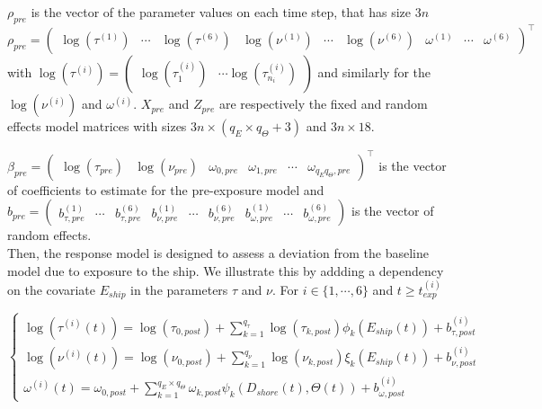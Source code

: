\documentclass[11pt]{article}
\newcommand {\1}{\mathbb{1}}
\begin{document}
$\rho_{pre}$ is the vector of the parameter values on each time step, that has size $3n$ \[\rho_{pre}=\begin{pmatrix}
\log(\tau^{(1)}) & \cdots & \log(\tau^{(6)}) & \log(\nu^{(1)}) &
\cdots & \log(\nu^{(6)}) & \omega^{(1)}  &\cdots & \omega^{(6)}
\end{pmatrix}^\top\]
with $	\log(\tau^{(i)})=\begin{pmatrix} \log(\tau^{(i)}_1) & \cdots \log(\tau^{(i)}_{n_i})\end{pmatrix}$ and similarly for the $\log(\nu^{(i)})$ and $\omega^{(i)}$.
$X_{pre}$ and $Z_{pre}$ are respectively the fixed and random effects model matrices with sizes $3n \times (q_E\times q_{\Theta}+3)$ and $3n \times 18$.

$\beta_{pre}=\begin{pmatrix}
	\log(\tau_{pre}) &
	\log(\nu_{pre})  &
	\omega_{0,pre} &
	\omega_{1,pre} &
	\cdots & 
	\omega_{q_E q_{\Theta},pre}
\end{pmatrix}^\top$ is the vector of coefficients to estimate for the pre-exposure model and $b_{pre}=\begin{pmatrix}  b_{\tau,pre}^{(1)} &\cdots& b_{\tau,pre}^{(6)} &b_{\nu,pre}^{(1)}& \cdots & b_{\nu,pre}^{(6)} & b_{\omega,pre}^{(1)} & \cdots & b_{\omega,pre}^{(6)} \end{pmatrix}$ is the vector of random effects.\\

Then, the response model is designed to assess a deviation from the baseline model due to exposure to the ship. We illustrate this by addding a dependency on the covariate $E_{ship}$ in the parameters $\tau$ and $\nu$. 
For $i \in \{1, \cdots, 6\}$ and $t \geq t_{exp}^{(i)}$

\begin{equation} \left\{
	\begin{array}{l}
		
		\log(\tau^{(i)}(t))=\log(\tau_{0,post}) +\sum_{k=1}^{q_{\tau}} \log(\tau_{k,post})\phi_{k}(E_{ship}(t))+b^{(i)}_{\tau,post} \\
		\log(\nu^{(i)}(t))=\log(\nu_{0,post}) +  \sum_{k=1}^{q_{\nu}} \log(\nu_{k,post}) \xi_{k}(E_{ship}(t)) +b^{(i)}_{\nu,post}  \\
		\omega^{(i)}(t)=\omega_{0,post}+\sum_{k=1}^{q_E\times q_{\Theta}} \omega_{k,post} \psi_k(D_{shore}(t),\Theta(t)) + b_{\omega,post}^{(i)}
	\end{array}
	\right.
	\label{eq: response model}
\end{equation}
\end{document}
